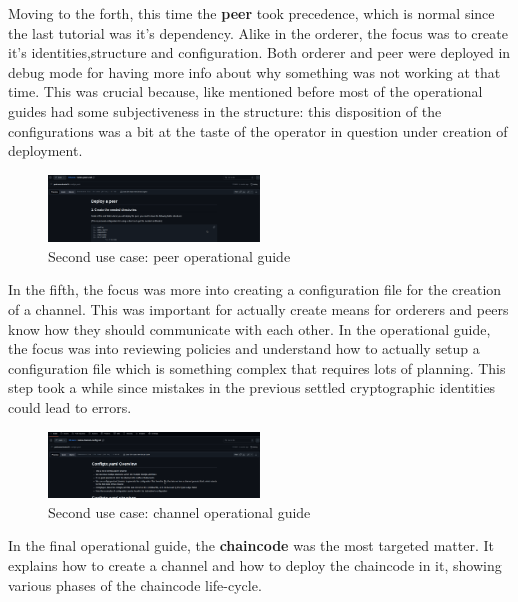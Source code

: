 Moving to the forth, this time the \textbf{peer} took precedence, which is normal since the last tutorial was it's dependency. Alike in the orderer, the focus was to create it's identities,structure and configuration. Both orderer and peer were deployed in debug mode for having more info about why something was not working at that time. This was crucial because, like mentioned before most of the operational guides had some subjectiveness in the structure: this disposition of the configurations was a bit at the taste of the operator in question under creation of deployment.

\begin{figure}[H]
    \centering
    \includegraphics[width=0.5\textwidth]{assets/use-case-2/notes-peers.png} %
    \caption{Second use case: peer operational guide}
    \label{fig:sample-image} 
\end{figure}

In the fifth, the focus was more into creating a configuration file for the creation of a channel. This was important for actually create means for orderers and peers know how they should communicate with each other. In the operational guide, the focus was into reviewing policies and understand how to actually setup a configuration file which is something complex that requires lots of planning. This step took a while since mistakes in the previous settled cryptographic identities could lead to errors. 

\begin{figure}[H]
    \centering
    \includegraphics[width=0.5\textwidth]{assets/use-case-2/notes-channel.png} %
    \caption{Second use case: channel operational guide}
    \label{fig:sample-image} 
\end{figure}

In the final operational guide, the \textbf{chaincode} was the most targeted matter.  It explains how to create a channel and how to deploy the chaincode in it, showing various phases of the chaincode life-cycle.

